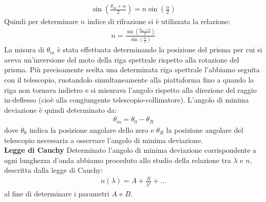 \documentclass[a4paper]{article}
\begin{document}
\begin{align}
    \sin\left(\frac{\theta_m + \alpha}{2}\right) = n\sin\left(\frac{\alpha}{2}\right)
\label{eq:angolo min deviazione}
\end{align}
Quindi per determinare $n$ indice di rifrazione si è utilizzata la relazione:
\begin{align}
    n= \frac{\sin\left(\frac{\theta_m + \alpha}{2}\right)}{\sin\left(\frac{\alpha}{2}\right)}
\label{eq:indice di rifrazione}
\end{align}
La misura di $\theta_m$ è stata effettuata determinando la posizione del prisma per cui si aveva un'inversione del moto della riga spettrale rispetto alla rotazione del prisma. Più precisamente scelta una determinata riga spettrale l'abbiamo seguita con il telescopio, ruotandolo simultaneamente alla piattaforma fino a quando la riga non tornava indietro e si misurava l'angolo rispetto alla direzione del raggio in-deflesso (cioè alla congiungente telescopio-collimatore). L'angolo di minima deviazione è quindi determinato da: 
\begin{align}
    \theta_m = \theta_0-\theta_R
\label{eq:posizione zero}
\end{align}
dove $\theta_0$ indica la posizione angolare dello zero e $\theta_R$ la posizione angolare del telescopio necessaria a osservare l'angolo di minima deviazione.
\newline\\
\textbf{Legge di Cauchy} \newline
Determinato l'angolo di minima deviazione corrispondente a ogni lunghezza d'onda abbiamo proceduto allo studio della relazione tra $\lambda$ e $n$, descritta dalla legge di Cauchy:
\begin{align}
    n(\lambda) = A + \frac{B}{\lambda^2} + ...
\label{eq:Cauchy}
\end{align}
al fine di determinare i parametri $A$ e $B$.
\end{document}
